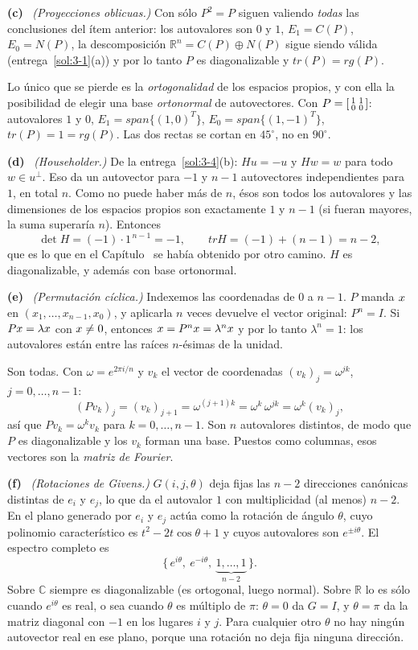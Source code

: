 \documentclass[11pt,a4paper]{article}
\makeatletter
\newcommand{\refnotas}[1]{\@ifundefined{r@#1}{\textup{[ver notas]}}{\ref{#1}}}
\newcommand{\bi}[1]{\boldsymbol{#1}}
\newcommand{\n}[1]{\boldsymbol{#1}}
\newcommand{\R}{\mathbb{R}}
\newcommand{\Cx}{\mathbb{C}}
\DeclareMathOperator{\gen}{span}
\DeclareMathOperator{\tr}{tr}
\DeclareMathOperator{\rg}{rg}
\def\n#1{#1}\def\bi#1{#1}\def\rg{rg}\def\tr{tr}\def\gen{span}%
\newcounter{entrega}[section]
\newcommand{\itemsol}[1]{\par\medskip\noindent\textbf{(#1)}\ \ignorespaces}
\makeatother
\begin{document}
\itemsol{c} \emph{(Proyecciones oblicuas.)} Con sólo $P^2=P$ siguen valiendo
\emph{todas} las conclusiones del ítem anterior: los autovalores son $0$ y $1$,
$E_1=C(P)$, $E_0=N(P)$, la descomposición $\R^n=C(P)\oplus N(P)$ sigue siendo
válida (entrega~\ref{sol:3-1}(a)) y por lo tanto $P$ es diagonalizable y
$\tr(P)=\rg(P)$.

Lo único que se pierde es la \emph{ortogonalidad} de los espacios propios, y con
ella la posibilidad de elegir una base \emph{ortonormal} de autovectores. Con
$P=\begin{bsmallmatrix}1&1\\0&0\end{bsmallmatrix}$: autovalores $1$ y $0$,
$E_1=\gen\{(1,0)^T\}$, $E_0=\gen\{(1,-1)^T\}$, $\tr(P)=1=\rg(P)$. Las dos rectas
se cortan en $45^\circ$, no en $90^\circ$.

\itemsol{d} \emph{(Householder.)} De la entrega~\ref{sol:3-4}(b): $H\n u=-\n u$
y $H\n w=\n w$ para todo $\n w\in\n u^{\perp}$. Eso da un autovector para $-1$ y
$n-1$ autovectores independientes para $1$, en total $n$. Como no puede haber
más de $n$, ésos son todos los autovalores y las dimensiones de los espacios
propios son exactamente $1$ y $n-1$ (si fueran mayores, la suma superaría $n$).
Entonces
\[
\det H=(-1)\cdot 1^{\,n-1}=-1,\qquad \tr H=(-1)+(n-1)=n-2 ,
\]
que es lo que en el Capítulo~\refnotas{cap:ortogonalidad} se había obtenido por otro
camino. $H$ es diagonalizable, y además con base ortonormal.

\itemsol{e} \emph{(Permutación cíclica.)} Indexemos las coordenadas de $0$ a
$n-1$. $P$ manda $\bx$ en $(x_1,\dots,x_{n-1},x_0)$, y aplicarla $n$ veces
devuelve el vector original: $P^n=I$. Si $P\bx=\lambda\bx$ con $\bx\neq\n0$,
entonces $\bx=P^n\bx=\lambda^n\bx$ y por lo tanto $\lambda^n=1$: los autovalores
están entre las raíces $n$-ésimas de la unidad.

Son todas. Con $\omega=e^{2\pi i/n}$ y $\n v_k$ el vector de coordenadas
$(\n v_k)_j=\omega^{jk}$, $j=0,\dots,n-1$:
\[
(P\n v_k)_j=(\n v_k)_{j+1}=\omega^{(j+1)k}=\omega^{k}\,\omega^{jk}
=\omega^{k}(\n v_k)_j ,
\]
así que $P\n v_k=\omega^k\n v_k$ para $k=0,\dots,n-1$. Son $n$ autovalores
distintos, de modo que $P$ es diagonalizable y los $\n v_k$ forman una base.
Puestos como columnas, esos vectores son la \emph{matriz de Fourier}.

\itemsol{f} \emph{(Rotaciones de Givens.)} $G(i,j,\theta)$ deja fijas las $n-2$
direcciones canónicas distintas de $\bi{e}_i$ y $\bi{e}_j$, lo que da el
autovalor $1$ con multiplicidad (al menos) $n-2$. En el plano generado por
$\bi{e}_i$ y $\bi{e}_j$ actúa como la rotación de ángulo $\theta$, cuyo polinomio
característico es $t^2-2t\cos\theta+1$ y cuyos autovalores son $e^{\pm i\theta}$.
El espectro completo es
\[
\{\,e^{i\theta},\ e^{-i\theta},\ \underbrace{1,\dots,1}_{n-2}\,\}.
\]
Sobre $\Cx$ siempre es diagonalizable (es ortogonal, luego normal). Sobre $\R$ lo
es sólo cuando $e^{i\theta}$ es real, o sea cuando $\theta$ es múltiplo de $\pi$:
$\theta=0$ da $G=I$, y $\theta=\pi$ da la matriz diagonal con $-1$ en los lugares
$i$ y $j$. Para cualquier otro $\theta$ no hay ningún autovector real en ese
plano, porque una rotación no deja fija ninguna dirección.
\end{document}
